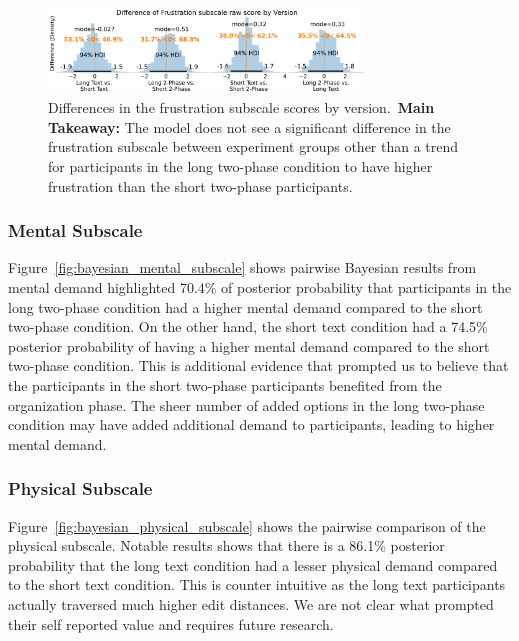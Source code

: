 \begin{figure}[h!]
    \centering
    \includegraphics[width=0.75\textwidth]{content/image/cog/Frustration_cog_diff_single_row.pdf}
    \caption{Differences in the frustration subscale scores by version.~\textbf{Main Takeaway:} The model does not see a significant difference in the frustration subscale between experiment groups other than a trend for participants in the long two-phase condition to have higher frustration than the short two-phase participants.}
    \label{fig:bayesian_frustration_subscale}
\end{figure}

\subsubsection{Mental Subscale}
Figure~\ref{fig:bayesian_mental_subscale} shows pairwise Bayesian results from mental demand highlighted 70.4\% of posterior probability that participants in the long two-phase condition had a higher mental demand compared to the short two-phase condition. On the other hand, the short text condition had a 74.5\% posterior probability of having a higher mental demand compared to the short two-phase condition. This is additional evidence that prompted us to believe that the participants in the short two-phase participants benefited from the organization phase. The sheer number of added options in the long two-phase condition may have added additional demand to participants, leading to higher mental demand.

\subsubsection{Physical Subscale}
Figure~\ref{fig:bayesian_physical_subscale} shows the pairwise comparison of the physical subscale. Notable results shows that there is a 86.1\% posterior probability that the long text condition had a lesser physical demand compared to the short text condition. This is counter intuitive as the long text participants actually traversed much higher edit distances. We are not clear what prompted their self reported value and requires future research. 

